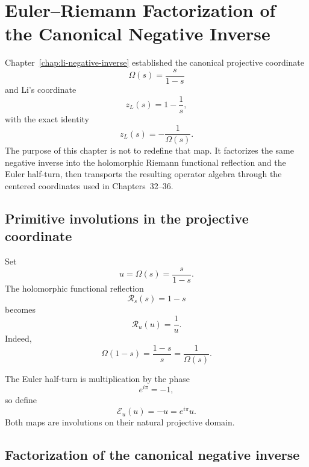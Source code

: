 \chapter{Euler--Riemann Factorization of the Canonical Negative Inverse}
\label{chap:euler-riemann-negative-inversion}


Chapter~\ref{chap:li-negative-inverse} established the canonical projective coordinate
\[
 \Omega(s)=\frac{s}{1-s}
\]
and Li's coordinate
\[
 z_L(s)=1-\frac1s,
\]
with the exact identity
\begin{equation}
 \boxed{z_L(s)=-\frac1{\Omega(s)}}.
 \label{eq:g012-li-negative-inverse}
\end{equation}
The purpose of this chapter is not to redefine that map.  It factorizes the same
negative inverse into the holomorphic Riemann functional reflection and the
Euler half-turn, then transports the resulting operator algebra through the
centered coordinates used in Chapters~32--36.

\section{Primitive involutions in the projective coordinate}

Set
\[
 u=\Omega(s)=\frac{s}{1-s}.
\]
The holomorphic functional reflection
\[
 \mathcal R_s(s)=1-s
\]
becomes
\begin{equation}
 \boxed{\mathcal R_u(u)=\frac1u}.
 \label{eq:g012-Ru}
\end{equation}
Indeed,
\[
 \Omega(1-s)=\frac{1-s}{s}=\frac1{\Omega(s)}.
\]

The Euler half-turn is multiplication by the phase
\[
 e^{i\pi}=-1,
\]
so define
\begin{equation}
 \boxed{\mathcal E_u(u)=-u=e^{i\pi}u}.
 \label{eq:g012-Eu}
\end{equation}
Both maps are involutions on their natural projective domain.

\section{Factorization of the canonical negative inverse}

